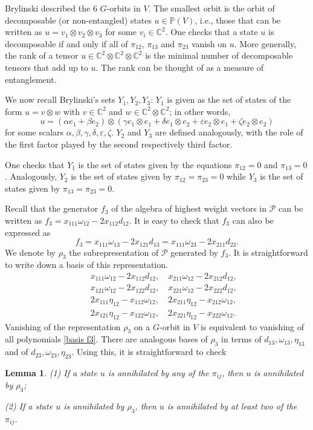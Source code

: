 \documentclass[reqno,11pt]{amsart}
\newtheorem{lem}[equation]{Lemma}
\theoremstyle{remark}
\theoremstyle{definition}
\numberwithin{equation}{section}
\newcommand\eps{{\varepsilon}}
\newcommand\ot{\otimes}
\newcommand{\eq}{\begin{equation}}
\newcommand{\eeq}{\end{equation}}
\newcommand{\bbC}{\mathbb{C}}
\newcommand{\Pol}{\mathcal{P}}
\newcommand{\bbP}{\mathbb{P}}
\begin{document}
Brylinski \cite{B} described the 6 $G$-orbits in $V$. The smallest orbit is the orbit of decomposable (or non-entangled) states $u\in\bbP(V)$, i.e., those that can be written as $u=v_1\ot v_2\ot v_3$ for some $v_i\in\bbC^2$. One checks that a state $u$ is decomposable if and only if
all of $\pi_{12}$, $\pi_{13}$ and $\pi_{23}$ vanish on $u$. More generally, the rank of a tensor  $u\in\bbC^2\otimes\bbC^2\otimes\bbC^2$ is the minimal number of decomposable tensors that add up to $u$. The rank can be thought of as a measure of entanglement.

We now recall Brylinski's sets $Y_1,Y_2,Y_3$: $Y_1$ is given as the set of states of the form $u=v\ot w$ with $v\in\bbC^2$ and $w\in\bbC^2\ot\bbC^2$; in other words, 
\eq
\label{Y1}
u=(\alpha e_1+\beta e_2)\ot(\gamma e_1\ot e_1+\delta e_1\ot e_2+\eps e_2\ot e_1+\zeta e_2\ot e_2)
\eeq
for some scalars $\alpha,\beta,\gamma,\delta,\eps,\zeta$. $Y_2$ and $Y_3$ are defined analogously, with the role of the first factor played by the second respectively third factor.

One checks that $Y_1$ is the set of states given by the equations $\pi_{12}=0$ and $\pi_{13}=0$. Analogously, $Y_2$ is the set of states given by $\pi_{12}=\pi_{23}=0$ while $Y_3$ is the set of states given by $\pi_{13}=\pi_{23}=0$.

Recall that the generator $f_3$ of the algebra of highest weight vectors in $\Pol$ can be written as
$f_3=x_{111}\omega_{12}-2x_{112}d_{12}$. It is easy to check that $f_3$ can also be expressed as
\[
f_3=x_{111}\omega_{13}-2x_{121}d_{13}=x_{111}\omega_{23}-2x_{211}d_{23}.
\]
We denote by $\rho_3$ the subrepresentation of $\Pol$ generated by $f_3$. It is straightforward to write down a basis of this representation.
\begin{eqnarray}
\label{basis f3}
&& x_{111}\omega_{12}-2x_{112}d_{12},\quad x_{211}\omega_{12}-2x_{212}d_{12},\\ \nonumber &&x_{121}\omega_{12}-2x_{122}d_{12},\quad 
 x_{221}\omega_{12}-2x_{222}d_{12},\\ 
 \nonumber 
&& 2x_{111}\eta_{12}-x_{112}\omega_{12},\quad
 2x_{211}\eta_{12}-x_{212}\omega_{12},\\ \nonumber && 
 2x_{121}\eta_{12}-x_{122}\omega_{12},\quad
2x_{221}\eta_{12}-x_{222}\omega_{12}. 
\end{eqnarray}
Vanishing of the representation $\rho_3$ on a $G$-orbit in $V$ is equivalent to vanishing of all polynomials \eqref{basis f3}. There are analogous bases of $\rho_3$ in terms of $d_{13},\omega_{13},\eta_{13}$ and of $d_{23},\omega_{23},\eta_{23}$.
Using this, it is straightforward to check
\begin{lem}
\label{f3 vs dij}
(1) If a state $u$ is annihilated by any of the $\pi_{ij}$, then $u$ is annihilated by $\rho_3$;

(2) If a state $u$ is annihilated by $\rho_3$,  then $u$ is annihilated by at least two of the $\pi_{ij}$.
\end{lem}
\end{document}
